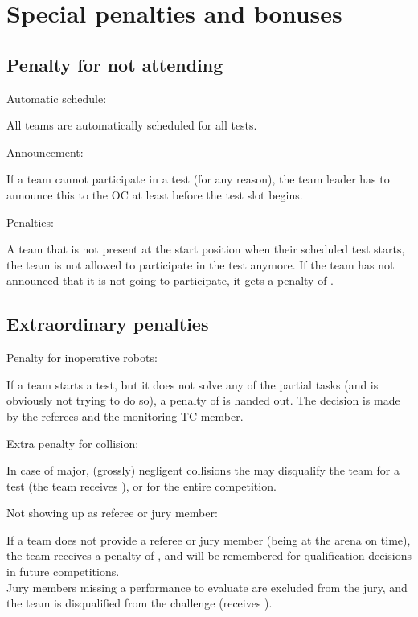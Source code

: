 \section{Special penalties and bonuses}\label{sec:special_awards}

\subsection{Penalty for not attending}\label{rule:not_attending}
\begin{enumerate}
	{\bf\item Automatic schedule:} All teams are automatically scheduled for all tests.
	{\bf\item Announcement:} If a team cannot participate in a test (for any reason), the team leader has to announce this to the OC at least  before the test slot begins.
	{\bf\item Penalties:} A team that is not present at the start position when their scheduled test starts, the team is not allowed to participate in the test anymore. If the team has not announced that it is not going to participate, it gets a penalty of . 
\end{enumerate}

\subsection{Extraordinary penalties}\label{rule:extraordinary_penalties}
\begin{enumerate}
	{\bf\item Penalty for inoperative robots:} If a team starts a test, but it does not solve any of the partial tasks (and is obviously not trying to do so), a penalty of  is handed out. The decision is made by the referees and the monitoring TC member.  
	{\bf\item Extra penalty for collision:} In case of major, (grossly) negligent collisions the  may disqualify the team for a test (the team receives ), or for the entire competition.
	{\bf\item Not showing up as referee or jury member:} If a team does not provide a referee or jury member (being at the arena on time), the team receives a penalty of , and will be remembered for qualification decisions in future competitions.\\
	Jury members missing a performance to evaluate are excluded from the jury, and the team is 	disqualified from the challenge (receives ).
\end{enumerate}

